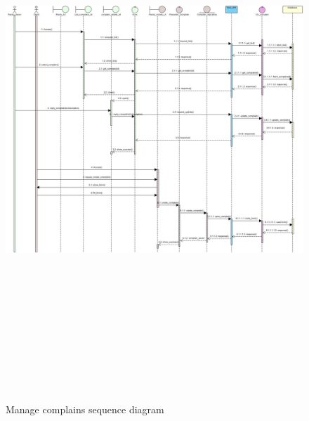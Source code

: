 \documentclass[12pt,a4paper]{report}
\begin{document}
\begin{figure}[H]
	\centering
	\includegraphics[width=7in,height=8in]{managecomplains.jpg}
	\caption{Manage complains sequence diagram}
	\label{complains-sequence}
\end{figure}
\clearpage
\end{document}
